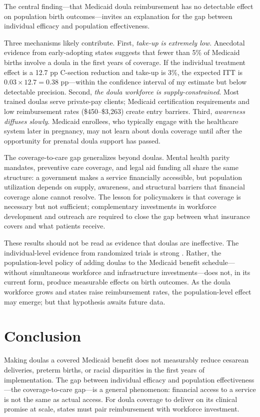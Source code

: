 \documentclass[12pt]{article}
\begin{document}
The central finding---that Medicaid doula reimbursement has no detectable effect on population birth outcomes---invites an explanation for the gap between individual efficacy and population effectiveness.

Three mechanisms likely contribute. First, \textit{take-up is extremely low}. Anecdotal evidence from early-adopting states suggests that fewer than 5\% of Medicaid births involve a doula in the first years of coverage. If the individual treatment effect is a 12.7 pp C-section reduction and take-up is 3\%, the expected ITT is $0.03 \times 12.7 = 0.38$ pp---within the confidence interval of my estimate but below detectable precision. Second, \textit{the doula workforce is supply-constrained}. Most trained doulas serve private-pay clients; Medicaid certification requirements and low reimbursement rates (\$450--\$3,263) create entry barriers. Third, \textit{awareness diffuses slowly}. Medicaid enrollees, who typically engage with the healthcare system later in pregnancy, may not learn about doula coverage until after the opportunity for prenatal doula support has passed.

The coverage-to-care gap generalizes beyond doulas. Mental health parity mandates, preventive care coverage, and legal aid funding all share the same structure: a government makes a service financially accessible, but population utilization depends on supply, awareness, and structural barriers that financial coverage alone cannot resolve. The lesson for policymakers is that coverage is necessary but not sufficient; complementary investments in workforce development and outreach are required to close the gap between what insurance covers and what patients receive.

These results should not be read as evidence that doulas are ineffective. The individual-level evidence from randomized trials is strong \citep{bohren2017}. Rather, the population-level policy of adding doulas to the Medicaid benefit schedule---without simultaneous workforce and infrastructure investments---does not, in its current form, produce measurable effects on birth outcomes. As the doula workforce grows and states raise reimbursement rates, the population-level effect may emerge; but that hypothesis awaits future data.


\section{Conclusion}

Making doulas a covered Medicaid benefit does not measurably reduce cesarean deliveries, preterm births, or racial disparities in the first years of implementation. The gap between individual efficacy and population effectiveness---the coverage-to-care gap---is a general phenomenon: financial access to a service is not the same as actual access. For doula coverage to deliver on its clinical promise at scale, states must pair reimbursement with workforce investment.
\end{document}
